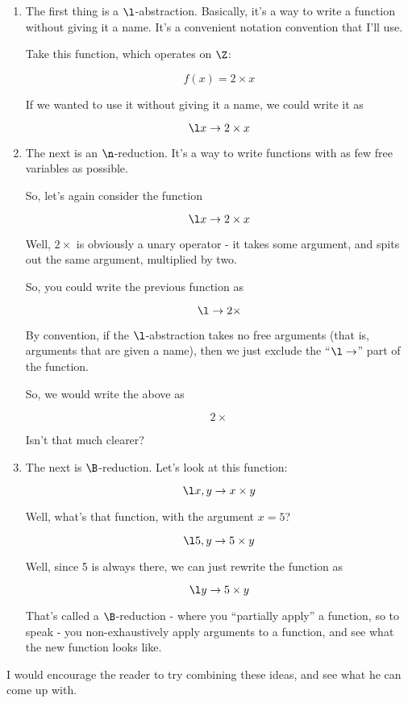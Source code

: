 \begin{enumerate}
\item The first thing is a $\l$-abstraction. Basically, it's a way to write a
  function without giving it a name. It's a convenient notation convention that
  I'll use.
  
  Take this function, which operates on $\Z$:
  
  \[ f(x) = 2 \times x \]

  If we wanted to use it without giving it a name, we could write it as

  \[ \l x \to 2 \times x \]
  
\item The next is an $\n$-reduction. It's a way to write functions with as few
  free variables as possible.

  So, let's again consider the function
  
  \[ \l x \to 2 \times x \]
  
  Well, $2 \times$ is obviously a unary operator - it takes some argument, and
  spits out the same argument, multiplied by two.

  So, you could write the previous function as

  \[ \l \to 2 \times \]
  
  By convention, if the $\l$-abstraction takes no free arguments (that is,
  arguments that are given a name), then we just exclude the ``$\l \to$'' part
  of the function.

  So, we would write the above as

  \[ 2 \times \]
  
  Isn't that much clearer?
  
\item The next is $\B$-reduction. Let's look at this function:

  \[ \l x, y \to x \times y\]
  
  Well, what's that function, with the argument $x=5$? 

  \[ \l 5, y \to 5 \times y \]

  Well, since 5 is always there, we can just rewrite the function as

  \[ \l y \to 5 \times y \]

  That's called a $\B$-reduction - where you ``partially apply'' a function, so
  to speak - you non-exhaustively apply arguments to a function, and see what
  the new function looks like. 
\end{enumerate}

I would encourage the reader to try combining these ideas, and see what he can
come up with.


